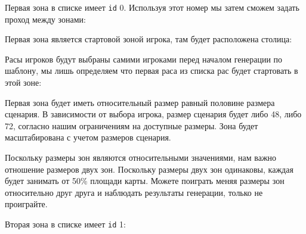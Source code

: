Первая зона в списке имеет \texttt{id} 0. Используя этот номер мы затем сможем задать проход между зонами:

\begin{figure}[H]

\end{figure}

Первая зона является стартовой зоной игрока, там будет расположена столица:

\begin{figure}[H]

\end{figure}

Расы игроков будут выбраны самими игроками перед началом генерации по шаблону, мы лишь определяем что первая раса из списка рас будет стартовать в этой зоне:

\begin{figure}[H]

\end{figure}

Первая зона будет иметь относительный размер равный половине размера сценария. В зависимости от выбора игрока, размер сценария будет либо 48, либо 72, согласно нашим ограничениям на доступные размеры. Зона будет масштабирована с учетом размеров сценария.

\begin{figure}[H]

\end{figure}

Поскольку размеры зон являются относительными значениями, нам важно отношение размеров двух зон. Поскольку размеры двух зон одинаковы, каждая будет занимать от 50\% площади карты. Можете поиграть меняя размеры зон относительно друг друга и наблюдать результаты генерации, только не проиграйте.

\begin{figure}[H]


\end{figure}

Вторая зона в списке имеет \texttt{id} 1:

\begin{figure}[H]

\end{figure}

